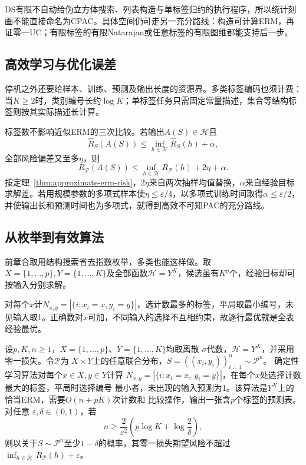 DS有限不自动给伪立方体搜索、列表构造与单标签归约的执行程序，所以统计刻画不能直接命名为CPAC。具体空间仍可走另一充分路线：构造可计算ERM，再证零一UC；有限标签的有限Natarajan或任意标签的有限图维都能支持后一步。

\subsection{高效学习与优化误差}

停机之外还要给样本、训练、预测及输出长度的资源界。多类标签编码也须计费：当$K\geq2$时，类别编号长约$\log K$；单标签任务只需固定常量描述，集合等结构标签则按其实际描述长计算。

标签数不影响近似ERM的三次比较。若输出$A(S)\in\mathcal H$且
\[
 \hat R_S(A(S))\leq\inf_{h\in\mathcal H}\hat R_S(h)+\alpha,
\]
全部风险偏差又至多$\eta$，则
\[
 R_{\mathcal P}(A(S))\leq\inf_{h\in\mathcal H}R_{\mathcal P}(h)+2\eta+\alpha.
\]
按定理~\ref{thm:approximate-erm-risk}，$2\eta$来自两次抽样均值替换，$\alpha$来自经验目标求解差。若用规模参数的多项式样本使$\eta\leq\varepsilon/4$，以多项式训练时间取得$\alpha\leq\varepsilon/2$，并使输出长和预测时间也为多项式，就得到高效不可知PAC的充分路线。

\subsection{从枚举到有效算法}

前章合取用结构搜索省去指数枚举，多类也能这样做。取$X=\{1,\ldots,p\},Y=\{1,\ldots,K\}$及全部函数$\mathcal H=Y^X$，候选虽有$K^p$个，经验目标却可按输入分别求解。

对每个$x$计$N_{x,y}=|\{i:x_i=x,y_i=y\}|$，选计数最多的标签，平局取最小编号，未见输入取1。正确数对$x$可加，不同输入的选择不互相约束，故逐行最优就是全表经验最优。

\begin{theorem}[有限输入上的多分类表学习]
\label{thm:multiclass-table-erm}
设$p,K,n\geq1$，$X=\{1,\ldots,p\}$、$Y=\{1,\ldots,K\}$均取离散
$\sigma$代数，$\mathcal H=Y^X$，并采用零一损失。令$\mathcal P$为
$X\times Y$上的任意联合分布，$S=((x_i,y_i))_{i=1}^n\sim\mathcal P^n$。
确定性学习算法对每个$x\in X,y\in Y$计算
$N_{x,y}=|\{i:x_i=x,\ y_i=y\}|$，在每个$x$处选择计数最大的标签，平局时选择编号
最小者，未出现的输入预测为1。该算法是$Y^X$上的恰当ERM，需要$O(n+pK)$次计数和
比较操作，输出一张含$p$个标签的预测表。对任意
$\varepsilon,\delta\in(0,1)$，若
\[
 n\geq\frac{2}{\varepsilon^2}
       \left(p\log K+\log\frac2\delta\right),
\]
则以关于$S\sim\mathcal P^n$至少$1-\delta$的概率，其零一损失期望风险不超过
$\inf_{h\in\mathcal H}R_{\mathcal P}(h)+\varepsilon$。
\end{theorem}

